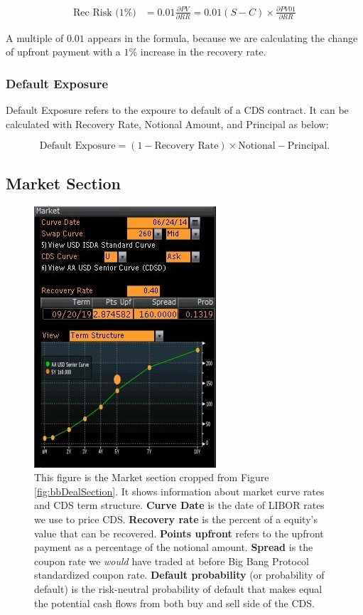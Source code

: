 \documentclass{jss}
\begin{document}
\begin{align*}
  \text{Rec Risk (1\%)} &= 0.01 \frac{\partial PV}{\partial RR} = 0.01 (S - C) \times \frac{\partial PV01}{\partial RR}
\end{align*}

A multiple of $0.01$ appears in the formula, because we are calculating the change of upfront payment with a $1\%$ increase in the recovery rate.

\subsubsection{Default Exposure}
\label{sec:DefaultExpo}

Default Exposure refers to the expoure to default of a CDS contract. It can be calculated with Recovery Rate, Notional Amount, and Principal as below:

\begin{equation}
  \text{Default Exposure} = (1 - \text{Recovery Rate}) \times \text{Notional}
  - \text{Principal}. \nonumber
\end{equation} 



\subsection{Market Section}
\label{Market section}
\begin{figure}[H]
\centering
\includegraphics[width=.3\textwidth]{images/AlcoaIncCDSMarket.jpg}
\caption{
This figure is the Market section cropped from Figure \ref{fig:bbDealSection}. It shows information about market curve rates and CDS term structure. \textbf{Curve Date} is the date of LIBOR rates we use to price CDS. \textbf{Recovery rate} is the percent of a equity's value that can be recovered. \textbf{Points upfront} refers to the upfront payment as a percentage of the notional amount. \textbf{Spread} is the coupon rate we \textit{would} have traded at before Big Bang Protocol standardized coupon rate. \textbf{Default probability} (or probability of default) is the risk-neutral probability of default that makes equal the potential cash flows from both buy and sell side of the CDS.}

\label{AlcoaIncCDSMarket}
\end{figure}
\end{document}
